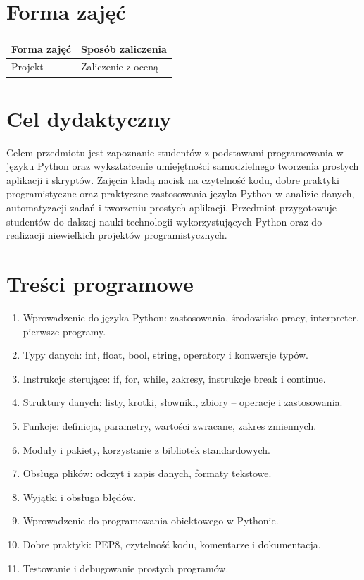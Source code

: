 \documentclass[12pt, a4paper]{article}
\begin{document}
\section{Forma zajęć}

\begin{tabular}{ll}
  \hline
  \textbf{Forma zajęć} & \textbf{Sposób zaliczenia} \\
  \hline
  Projekt & Zaliczenie z oceną \\
  \hline
\end{tabular}

\section{Cel dydaktyczny}

Celem przedmiotu jest zapoznanie studentów z podstawami programowania w języku Python oraz wykształcenie umiejętności samodzielnego tworzenia prostych aplikacji i skryptów. Zajęcia kładą nacisk na czytelność kodu, dobre praktyki programistyczne oraz praktyczne zastosowania języka Python w analizie danych, automatyzacji zadań i tworzeniu prostych aplikacji. Przedmiot przygotowuje studentów do dalszej nauki technologii wykorzystujących Python oraz do realizacji niewielkich projektów programistycznych.

\section{Treści programowe}

\begin{enumerate}
  \item Wprowadzenie do języka Python: zastosowania, środowisko pracy, interpreter, pierwsze programy.
  \item Typy danych: int, float, bool, string, operatory i konwersje typów.
  \item Instrukcje sterujące: if, for, while, zakresy, instrukcje break i continue.
  \item Struktury danych: listy, krotki, słowniki, zbiory – operacje i zastosowania.
  \item Funkcje: definicja, parametry, wartości zwracane, zakres zmiennych.
  \item Moduły i pakiety, korzystanie z bibliotek standardowych.
  \item Obsługa plików: odczyt i zapis danych, formaty tekstowe.
  \item Wyjątki i obsługa błędów.
  \item Wprowadzenie do programowania obiektowego w Pythonie.
  \item  Dobre praktyki: PEP8, czytelność kodu, komentarze i dokumentacja.
  \item  Testowanie i debugowanie prostych programów.
\end{enumerate}
\end{document}
